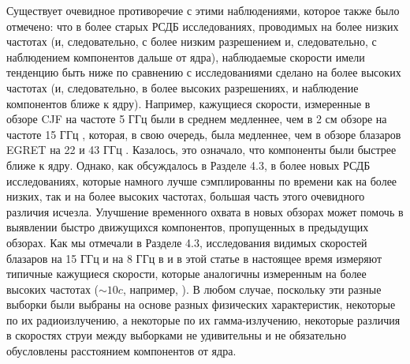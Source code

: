 Существует очевидное противоречие с этими наблюдениями, которое также было отмечено: что в более
старых РСДБ исследованиях, проводимых на более низких частотах (и, следовательно, с более низким
разрешением и, следовательно, с наблюдением компонентов дальше от ядра), наблюдаемые скорости имели
тенденцию быть ниже по сравнению с исследованиями сделано на более высоких частотах (и,
следовательно, в более высоких разрешениях, и наблюдение компонентов ближе к ядру). Например,
кажущиеся скорости, измеренные в обзоре CJF \cite{Britzen_2008} на частоте 5 ГГц были в среднем
медленнее, чем в 2 см обзоре на частоте 15 ГГц \cite{Kellermann_2004}, которая, в свою очередь,
была медленнее, чем в обзоре блазаров EGRET на 22 и 43 ГГц \cite{Jorstad_2001}. Казалось, это
означало, что компоненты были быстрее ближе к ядру. Однако, как обсуждалось в Разделе 4.3, в более
новых РСДБ исследованиях, которые намного лучше сэмплированны по времени как на более низких, так и
на более высоких частотах, большая часть этого очевидного различия исчезла. Улучшение временного
охвата в новых обзорах может помочь в выявлении быстро движущихся компонентов, пропущенных в
предыдущих обзорах. Как мы отмечали в Разделе 4.3, исследования видимых скоростей блазаров на 15
ГГц и на 8 ГГц в \cite{Lister_2009b} и в этой статье в настоящее время измеряют типичные кажущиеся
скорости, которые аналогичны измеренным на более высоких частотах ($\sim10c$, например,
\cite{Jorstad_2005}). В любом случае, поскольку эти разные выборки были выбраны на основе разных
физических характеристик, некоторые по их радиоизлучению, а некоторые по их гамма-излучению,
некоторые различия в скоростях струи между выборками не удивительны и не обязательно обусловлены
расстоянием компонентов от ядра.

